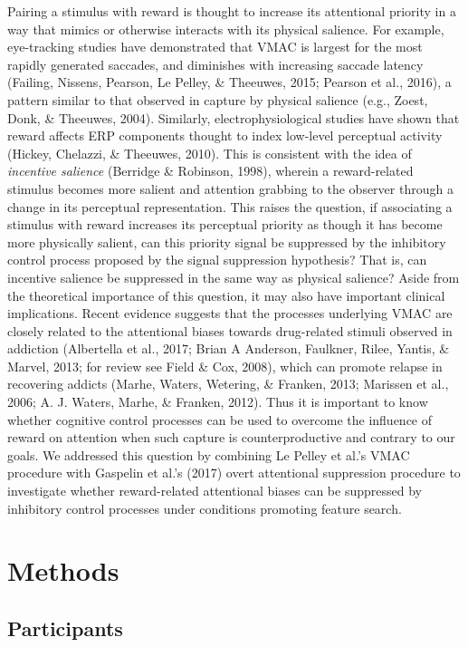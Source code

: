 \documentclass[jou, a4paper, noextraspace,floatsintext]{apa6}
\theoremstyle{definition}
\theoremstyle{definition}
\theoremstyle{definition}
\theoremstyle{remark}
\begin{document}
Pairing a stimulus with reward is thought to increase its attentional
priority in a way that mimics or otherwise interacts with its physical
salience. For example, eye-tracking studies have demonstrated that VMAC
is largest for the most rapidly generated saccades, and diminishes with
increasing saccade latency (Failing, Nissens, Pearson, Le Pelley, \&
Theeuwes, 2015; Pearson et al., 2016), a pattern similar to that
observed in capture by physical salience (e.g., Zoest, Donk, \&
Theeuwes, 2004). Similarly, electrophysiological studies have shown that
reward affects ERP components thought to index low-level perceptual
activity (Hickey, Chelazzi, \& Theeuwes, 2010). This is consistent with
the idea of \emph{incentive salience} (Berridge \& Robinson, 1998),
wherein a reward-related stimulus becomes more salient and attention
grabbing to the observer through a change in its perceptual
representation. This raises the question, if associating a stimulus with
reward increases its perceptual priority as though it has become more
physically salient, can this priority signal be suppressed by the
inhibitory control process proposed by the signal suppression
hypothesis? That is, can incentive salience be suppressed in the same
way as physical salience? Aside from the theoretical importance of this
question, it may also have important clinical implications. Recent
evidence suggests that the processes underlying VMAC are closely related
to the attentional biases towards drug-related stimuli observed in
addiction (Albertella et al., 2017; Brian A Anderson, Faulkner, Rilee,
Yantis, \& Marvel, 2013; for review see Field \& Cox, 2008), which can
promote relapse in recovering addicts (Marhe, Waters, Wetering, \&
Franken, 2013; Marissen et al., 2006; A. J. Waters, Marhe, \& Franken,
2012). Thus it is important to know whether cognitive control processes
can be used to overcome the influence of reward on attention when such
capture is counterproductive and contrary to our goals. We addressed
this question by combining Le Pelley et al.'s VMAC procedure with
Gaspelin et al.'s (2017) overt attentional suppression procedure to
investigate whether reward-related attentional biases can be suppressed
by inhibitory control processes under conditions promoting feature
search.

\section{Methods}\label{methods}

\subsection{Participants}\label{participants}
\end{document}
